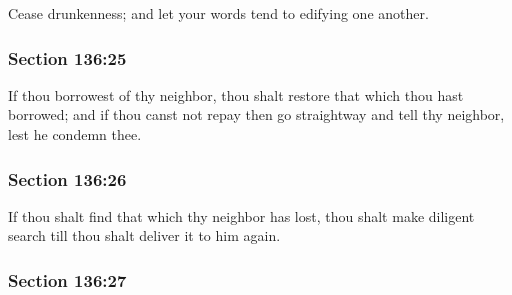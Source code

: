 		Cease drunkenness; and let your words tend to edifying one another.


	\subsubsection{Section 136:25} %
		\label{DC136-25}

		If thou borrowest of thy neighbor, thou shalt restore that which thou hast borrowed; and if thou canst not repay then go straightway and tell thy neighbor, lest he condemn thee.


	\subsubsection{Section 136:26} %
		\label{DC136-26}

		If thou shalt find that which thy neighbor has lost, thou shalt make diligent search till thou shalt deliver it to him again.


	\subsubsection{Section 136:27} %
		\label{DC136-27}

